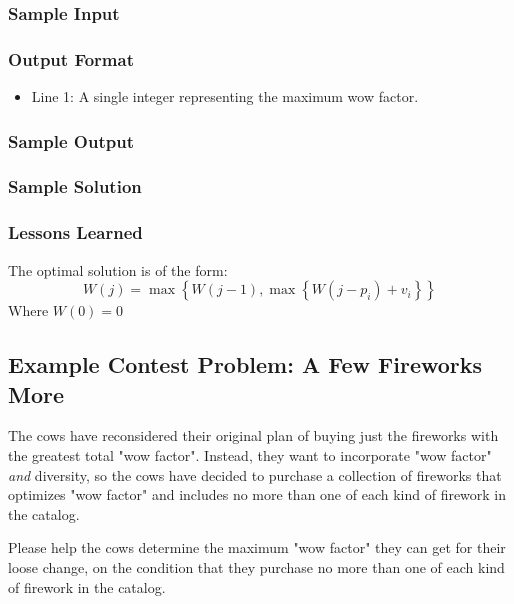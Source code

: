 \subsubsection{Sample Input}

\subsubsection{Output Format}
\begin{itemize}
	\item Line 1: A single integer representing the maximum wow factor.
\end{itemize}
\subsubsection{Sample Output}

\subsubsection{Sample Solution}

\subsubsection{Lessons Learned}
The optimal solution is of the form:
$$W(j) = \max \left\{W(j-1), \max \left\{W(j - p_i) + v_i \right\}\right\}$$
Where $W(0) = 0$

\subsection{Example Contest Problem: A Few Fireworks More}
The cows have reconsidered their original plan of buying just the fireworks with the greatest total "wow factor".
Instead, they want to incorporate "wow factor" \emph{and} diversity, so the cows have decided to purchase a collection of fireworks that optimizes "wow factor" and includes no more than one of each kind of firework in the catalog.

Please help the cows determine the maximum "wow factor" they can get for their loose change, on the condition that they purchase no more than one of each kind of firework in the catalog.

